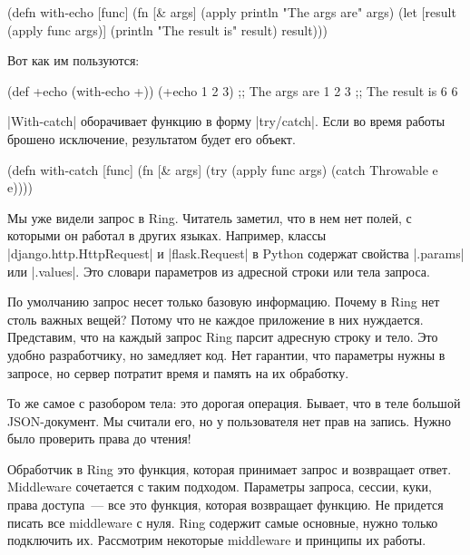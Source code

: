 \begin{english}
  \begin{clojure}
(defn with-echo [func]
  (fn [& args]
    (apply println "The args are" args)
    (let [result (apply func args)]
      (println "The result is" result)
      result)))
  \end{clojure}
\end{english}

Вот как им пользуются:

\begin{english}
  \begin{clojure}
(def +echo (with-echo +))
(+echo 1 2 3)
;; The args are 1 2 3
;; The result is 6
6
  \end{clojure}
\end{english}

\spverb|With-catch| оборачивает функцию в форму \spverb|try/catch|. Если во
время работы брошено исключение, результатом будет его объект.

\begin{english}
  \begin{clojure}
(defn with-catch [func]
  (fn [& args]
    (try
      (apply func args)
      (catch Throwable e
        e))))
  \end{clojure}
\end{english}

Мы уже видели запрос в Ring. Читатель заметил, что в нем нет полей, с которыми
он работал в других языках. Например, классы \spverb|django.http.HttpRequest| и
\spverb|flask.Request| в Python содержат свойства \spverb|.params| или
\spverb|.values|. Это словари параметров из адресной строки или тела запроса.

По умолчанию запрос несет только базовую информацию. Почему в Ring нет столь
важных вещей? Потому что не каждое приложение в них нуждается. Представим, что
на каждый запрос Ring парсит адресную строку и тело. Это удобно разработчику, но
замедляет код. Нет гарантии, что параметры нужны в запросе, но сервер потратит
время и память на их обработку.

То же самое с разобором тела: это дорогая операция. Бывает, что в теле большой
JSON-документ. Мы считали его, но у пользователя нет прав на запись. Нужно было
проверить права до чтения!

Обработчик в Ring это функция, которая принимает запрос и возвращает
ответ. Middleware сочетается с таким подходом. Параметры запроса, сессии, куки,
права доступа~--- все это функция, которая возвращает функцию. Не придется
писать все middleware с нуля. Ring содержит самые основные, нужно только
подключить их. Рассмотрим некоторые middleware и принципы их работы.


